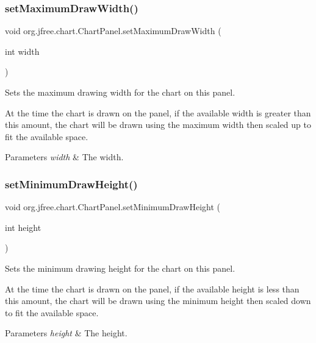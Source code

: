 \subsubsection{\texorpdfstring{set\+Maximum\+Draw\+Width()}{setMaximumDrawWidth()}}
{\footnotesize\ttfamily void org.\+jfree.\+chart.\+Chart\+Panel.\+set\+Maximum\+Draw\+Width (\begin{DoxyParamCaption}\item[{int}]{width }\end{DoxyParamCaption})}

Sets the maximum drawing width for the chart on this panel. 

At the time the chart is drawn on the panel, if the available width is greater than this amount, the chart will be drawn using the maximum width then scaled up to fit the available space.


\begin{DoxyParams}{Parameters}
{\em width} & The width. \\
\hline
\end{DoxyParams}
\mbox{\label{classorg_1_1jfree_1_1chart_1_1_chart_panel_ab2c58f9c8cd3d353b443aa11c161280f}} 
\subsubsection{\texorpdfstring{set\+Minimum\+Draw\+Height()}{setMinimumDrawHeight()}}
{\footnotesize\ttfamily void org.\+jfree.\+chart.\+Chart\+Panel.\+set\+Minimum\+Draw\+Height (\begin{DoxyParamCaption}\item[{int}]{height }\end{DoxyParamCaption})}

Sets the minimum drawing height for the chart on this panel. 

At the time the chart is drawn on the panel, if the available height is less than this amount, the chart will be drawn using the minimum height then scaled down to fit the available space.


\begin{DoxyParams}{Parameters}
{\em height} & The height. \\
\hline
\end{DoxyParams}
\mbox{\label{classorg_1_1jfree_1_1chart_1_1_chart_panel_aaedb4c6e3dde4e6bacbb5dd8295cf809}} 
